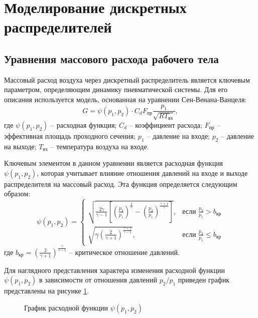 \section{Моделирование дискретных распределителей}\label{sec:ch2/sec3}

\subsection{Уравнения массового расхода рабочего тела}\label{sec:ch2/sec3/subsec1}
Массовый расход воздуха через дискретный распределитель
является ключевым параметром, определяющим динамику пневматической
системы. Для его описания используется модель, основанная на уравнении Сен-Венана-Ванцеля:
\begin{equation}
    G = \psi(p_1, p_2) \cdot C_d F_\text{пр} \frac{p_1}{\sqrt{RT_\text{вх}}},
\end{equation}
где
$\psi(p_1, p_2)$ -- расходная функция;
$C_d$ -- коэффициент расхода;
$F_\text{пр}$ -- эффективная площадь проходного сечения;
$p_1$ -- давление на входе;
$p_2$ -- давление на выходе;
$T_\text{вх}$ -- температура воздуха на входе.

Ключевым элементом в данном уравнении является расходная функция $\psi(p_1, p_2)$, которая
учитывает влияние отношения давлений на входе и выходе распределителя
на массовый расход. Эта функция определяется следующим образом:
\begin{equation}
    \psi(p_1, p_2) = \begin{cases}
        \sqrt{\frac{2\gamma}{\gamma-1}\left[\left(\frac{p_2}{p_1}\right)^{\frac{2}{\gamma}} - \left(\frac{p_2}{p_1}\right)^{\frac{\gamma+1}{\gamma}}\right]}, & \text{если } \frac{p_2}{p_1} > b_{кр}    \\
        \sqrt{\gamma \left(\frac{2}{\gamma+1}\right)^{\frac{\gamma+1}{\gamma-1}}},                                                                            & \text{если } \frac{p_2}{p_1} \leq b_{кр}
    \end{cases}
\end{equation}
где
$b_{кр} = \left(\frac{2}{\gamma+1}\right)^{\frac{\gamma}{\gamma-1}}$ -- критическое отношение давлений.

Для наглядного представления характера изменения расходной функции
$\psi(p_1, p_2)$ в зависимости от отношения давлений $p_2/p_1$
приведен график представлены на рисунке \ref{fig:ch2/mass_flow_function}.
\begin{figure}
    \caption{График расходной функции $\psi(p_1, p_2)$}
    \label{fig:ch2/mass_flow_function}
\end{figure}

